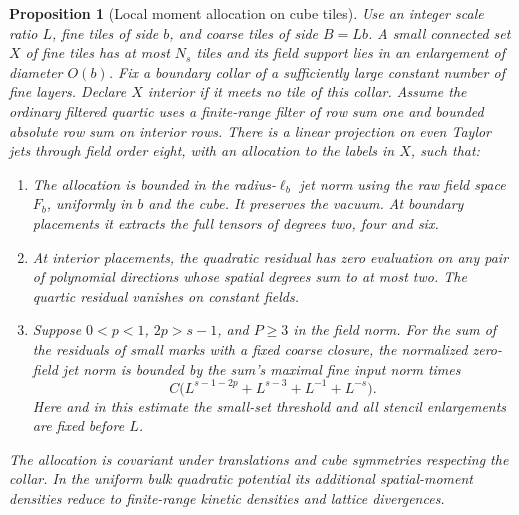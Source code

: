 \documentclass[11pt]{article}
\newtheorem{proposition}[theorem]{Proposition}
\theoremstyle{definition}
\begin{document}
\begin{proposition}[Local moment allocation on cube tiles]
\label{prop:cube-jet-projection}
Use an integer scale ratio \(L\), fine tiles of side \(b\), and
coarse tiles of side \(B=Lb\). A small connected set \(X\) of fine
tiles has at most \(N_s\) tiles and its field support lies in an
enlargement of diameter \(O(b)\). Fix a boundary collar of a
sufficiently large constant number of fine layers. Declare \(X\)
interior if it meets no tile of this collar. Assume the ordinary
filtered quartic uses a finite-range filter of row sum one and
bounded absolute row sum on interior rows. There is a linear
projection on even Taylor jets through field order eight, with
an allocation to the labels in \(X\), such that:
\begin{enumerate}
\item The allocation is bounded in the radius-\(\ell_b\) jet norm
using the raw field space \(F_b\), uniformly in \(b\) and the cube.
It preserves the vacuum. At boundary placements it extracts the
full tensors of degrees two, four and six.
\item At interior placements, the quadratic residual has zero
evaluation on any pair of polynomial directions whose spatial
degrees sum to at most two. The quartic residual vanishes on
constant fields.
\item Suppose \(0<p<1\), \(2p>s-1\), and \(P\ge3\) in the field norm.
For the sum of the residuals of small marks with a fixed coarse
closure, the normalized zero-field jet norm is bounded by the
sum's maximal fine input norm times
\begin{equation}
 C\bigl(L^{s-1-2p}+L^{s-3}+L^{-1}+L^{-s}\bigr).
\end{equation}
Here and in this estimate the small-set threshold and all stencil
enlargements are fixed before \(L\).
\end{enumerate}
The allocation is covariant under translations and cube
symmetries respecting the collar. In the uniform bulk quadratic
potential its additional spatial-moment densities reduce to
finite-range kinetic densities and lattice divergences.
\end{proposition}
\end{document}
